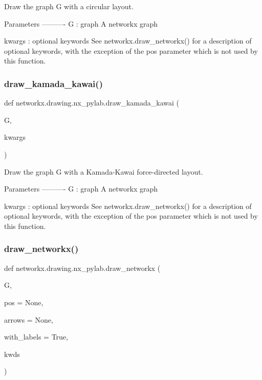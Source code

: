 \begin{DoxyVerb}Draw the graph G with a circular layout.

Parameters
----------
G : graph
    A networkx graph

kwargs : optional keywords
    See networkx.draw_networkx() for a description of optional keywords,
    with the exception of the pos parameter which is not used by this
    function.
\end{DoxyVerb}
 \mbox{\label{namespacenetworkx_1_1drawing_1_1nx__pylab_a62710432baf9e173eff963c9ee9cbf14}} 
\subsubsection{\texorpdfstring{draw\+\_\+kamada\+\_\+kawai()}{draw\_kamada\_kawai()}}
{\footnotesize\ttfamily def networkx.\+drawing.\+nx\+\_\+pylab.\+draw\+\_\+kamada\+\_\+kawai (\begin{DoxyParamCaption}\item[{}]{G,  }\item[{}]{kwargs }\end{DoxyParamCaption})}

\begin{DoxyVerb}Draw the graph G with a Kamada-Kawai force-directed layout.

Parameters
----------
G : graph
    A networkx graph

kwargs : optional keywords
    See networkx.draw_networkx() for a description of optional keywords,
    with the exception of the pos parameter which is not used by this
    function.
\end{DoxyVerb}
 \mbox{\label{namespacenetworkx_1_1drawing_1_1nx__pylab_ac656ed97042c7dca44219020d17dee0a}} 
\subsubsection{\texorpdfstring{draw\+\_\+networkx()}{draw\_networkx()}}
{\footnotesize\ttfamily def networkx.\+drawing.\+nx\+\_\+pylab.\+draw\+\_\+networkx (\begin{DoxyParamCaption}\item[{}]{G,  }\item[{}]{pos = {\ttfamily None},  }\item[{}]{arrows = {\ttfamily None},  }\item[{}]{with\+\_\+labels = {\ttfamily True},  }\item[{}]{kwds }\end{DoxyParamCaption})}

